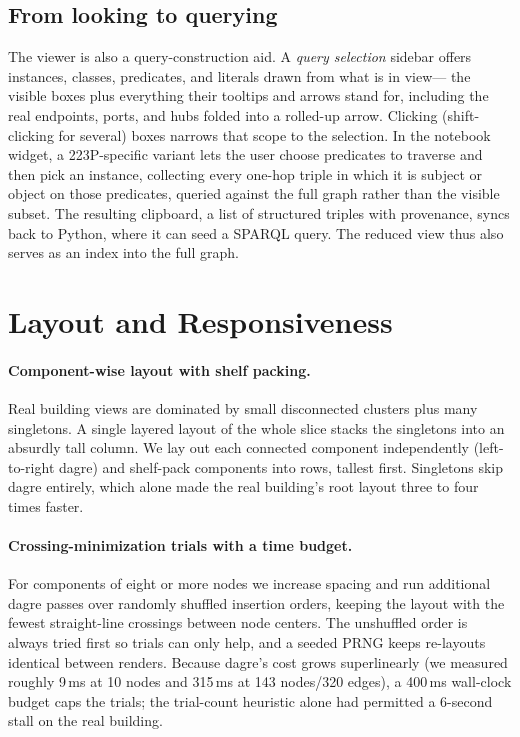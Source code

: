 \documentclass[10pt,twocolumn]{article}
\begin{document}
\subsection{From looking to querying}
The viewer is also a query-construction aid. A \emph{query selection} sidebar
offers instances, classes, predicates, and literals drawn from what is in view---
the visible boxes plus everything their tooltips and arrows stand for, including
the real endpoints, ports, and hubs folded into a rolled-up arrow. Clicking
(shift-clicking for several) boxes narrows that scope to the selection. In the
notebook widget, a 223P-specific variant lets the user choose predicates to
traverse and then pick an instance, collecting every one-hop triple in which it
is subject or object on those predicates, queried against the full graph rather
than the visible subset. The resulting clipboard, a list of structured triples
with provenance, syncs back to Python, where it can seed a SPARQL query. The
reduced view thus also serves as an index into the full graph.

\section{Layout and Responsiveness}
\label{sec:layout}

\paragraph{Component-wise layout with shelf packing.}
Real building views are dominated by small disconnected clusters plus many
singletons. A single layered layout of the whole slice stacks the singletons into
an absurdly tall column. We lay out each connected component independently
(left-to-right dagre) and shelf-pack components into rows, tallest first.
Singletons skip dagre entirely, which alone made the real building's root
layout three to four times faster.

\paragraph{Crossing-minimization trials with a time budget.}
For components of eight or more nodes we increase spacing and run additional
dagre passes over randomly shuffled insertion orders, keeping the layout with the
fewest straight-line crossings between node centers. The unshuffled order is
always tried first so trials can only help, and a seeded PRNG keeps re-layouts
identical between renders. Because dagre's cost grows superlinearly (we measured
roughly 9\,ms at 10 nodes and 315\,ms at 143 nodes/320 edges), a 400\,ms
wall-clock budget caps the trials; the trial-count heuristic alone had permitted a
6-second stall on the real building.
\end{document}
